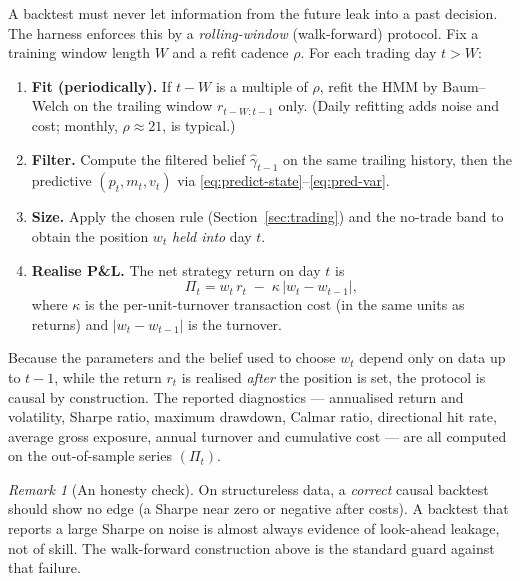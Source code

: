\documentclass[11pt]{article}
\newcommand{\obs}{r}
\theoremstyle{plain}
\theoremstyle{definition}
\theoremstyle{remark}
\newtheorem{remark}{Remark}
\begin{document}
A backtest must never let information from the future leak into a past decision.
The harness enforces this by a \emph{rolling-window} (walk-forward) protocol.
Fix a training window length $W$ and a refit cadence $\rho$. For each trading day
$t>W$:
\begin{enumerate}[label=\arabic*.,leftmargin=2em]
  \item \textbf{Fit (periodically).} If $t-W$ is a multiple of $\rho$, refit the
        HMM by Baum--Welch on the trailing window $\obs_{t-W:t-1}$ only. (Daily
        refitting adds noise and cost; monthly, $\rho\approx 21$, is typical.)
  \item \textbf{Filter.} Compute the filtered belief $\hat\gamma_{t-1}$ on the
        same trailing history, then the predictive
        $(p_t,m_t,v_t)$ via \eqref{eq:predict-state}--\eqref{eq:pred-var}.
  \item \textbf{Size.} Apply the chosen rule (Section~\ref{sec:trading}) and the
        no-trade band to obtain the position $w_t$ \emph{held into} day $t$.
  \item \textbf{Realise P\&L.} The net strategy return on day $t$ is
        \begin{equation}
          \Pi_t = w_t\,\obs_t \;-\; \kappa\,|w_t-w_{t-1}|,
        \end{equation}
        where $\kappa$ is the per-unit-turnover transaction cost (in the same
        units as returns) and $|w_t-w_{t-1}|$ is the turnover.
\end{enumerate}
Because the parameters and the belief used to choose $w_t$ depend only on data up
to $t-1$, while the return $\obs_t$ is realised \emph{after} the position is set,
the protocol is causal by construction. The reported diagnostics --- annualised
return and volatility, Sharpe ratio, maximum drawdown, Calmar ratio, directional
hit rate, average gross exposure, annual turnover and cumulative cost --- are all
computed on the out-of-sample series $(\Pi_t)$.

\begin{remark}[An honesty check]
On structureless data, a \emph{correct} causal backtest should show no edge (a
Sharpe near zero or negative after costs). A backtest that reports a large Sharpe
on noise is almost always evidence of look-ahead leakage, not of skill. The
walk-forward construction above is the standard guard against that failure.
\end{remark}

\end{document}
